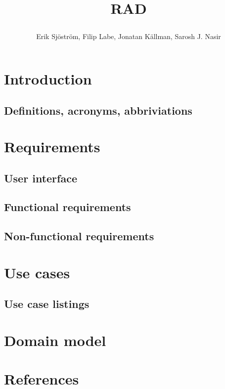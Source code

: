 \documentclass{article}
\title{
    RAD
    \author{Erik Sjöström,
            Filip Labe,
            Jonatan Källman,
            Sarosh J. Nasir}
}
\begin{document}
\maketitle

\section{Introduction}
\subsection{Definitions, acronyms, abbriviations}

\section{Requirements}
\subsection{User interface}
\subsection{Functional requirements}
\subsection{Non-functional requirements}

\section{Use cases}
\subsection{Use case listings}

\section{Domain model}

\section{References}
\end{document}
